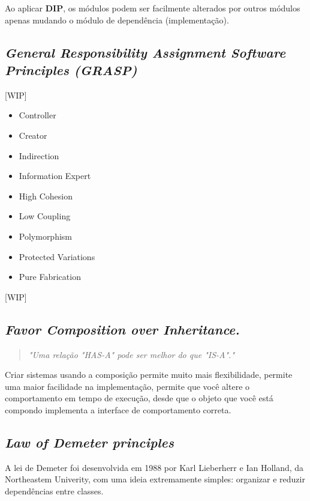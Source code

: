 \documentclass[12pt]{article}
\begin{document}
Ao aplicar \textbf{DIP}, os módulos podem ser facilmente alterados por outros módulos apenas mudando o módulo de dependência (implementação).


\subsection{\textit{General Responsibility Assignment Software Principles (GRASP)}} \label{sec:grasp}
[WIP]
\begin{itemize}
	\item Controller	
	\item Creator
	\item Indirection
	\item Information Expert
	\item High Cohesion
	\item Low Coupling
	\item Polymorphism
	\item Protected Variations
	\item Pure Fabrication
\end{itemize}
[WIP]

\subsection{\textit{Favor Composition over Inheritance.}} \label{sec:favor_composition}
\begin{quote}
\textit{"Uma relação "HAS-A" pode ser melhor do que "IS-A"."}\cite{HEADFIRST_DESIGN_PATTERN}
\end{quote}

Criar sistemas usando a composição permite muito mais flexibilidade, permite uma maior facilidade na implementação, permite que você altere o comportamento em tempo de execução, desde que o objeto que você está compondo implementa a interface de comportamento correta. 


\subsection{\textit{Law of Demeter principles}} \label{sec:law_of_demeter}

A lei de Demeter foi desenvolvida em 1988 por Karl Lieberherr e Ian Holland, da Northeastem Univerity, com uma ideia extremamente simples: organizar e reduzir dependências entre classes.
\end{document}
